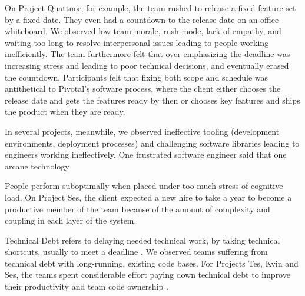 On Project Quattuor, for example, the team rushed to release a fixed feature set by a fixed date. They even had a countdown to the release date on an office whiteboard. We observed low team morale, rush mode, lack of empathy, and waiting too long to resolve interpersonal issues leading to people working inefficiently. The team furthermore felt that over-emphasizing the deadline was increasing stress and leading to poor technical decisions, and eventually erased the countdown. Participants felt that fixing both scope and schedule was antithetical to Pivotal's software process, where the client either chooses the release date and gets the features ready by then or chooses key features and ships the product when they are ready. 

In several projects, meanwhile, we observed ineffective tooling (development environments, deployment processes) and challenging software libraries leading to engineers working ineffectively. One frustrated software engineer said that one arcane technology 

People perform suboptimally when placed under too much stress of cognitive load. On Project Ses, the client expected a new hire to take a year to become a productive member of the team because of the amount of complexity and coupling in each layer of the system. 

Technical Debt refers to delaying needed technical work, by taking technical shortcuts, usually to meet a deadline \cite{McConnellTechnicalDebt}.  We observed teams suffering from technical debt with long-running, existing code bases. For Projects Tes, Kvin and Ses, the teams spent considerable effort paying down technical debt to improve their productivity and team code ownership \cite{SedanoTeamCodeOwnership}.  
